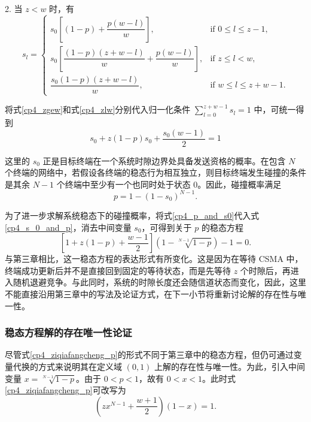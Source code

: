 2. 当 $z<w$ 时，有
    \begin{equation}\label{cp4_zlw}
        s_l =
\begin{cases}
s_0 \left[ (1 - p) + \dfrac{p(w-l)}{w} \right], & \text{if } 0 \le l \le z - 1, \\
s_0 \left[ \dfrac{(1-p)(z+w-l)}{w} + \dfrac{p(w-l)}{w} \right], & \text{if } z \le l < w, \\
\dfrac{s_0 (1-p)(z+w-l)}{w}, & \text{if } w \le l \le z + w - 1.
\end{cases}
    \end{equation}

将式\eqref{cp4_zgew}和式\eqref{cp4_zlw}分别代入归一化条件 $\sum_{l=0}^{z+w-1}s_l=1$ 中，可统一得到
\begin{equation}\label{cp4_s_0_and_p}
    s_0+z(1-p)s_0+\frac{s_0(w-1)}{2}=1
\end{equation}

这里的 $s_0$ 正是目标终端在一个系统时隙边界处具备发送资格的概率。在包含 $N$ 个终端的网络中，若假设各终端的稳态行为相互独立，则目标终端发生碰撞的条件是其余 $N-1$ 个终端中至少有一个也同时处于状态 0。因此，碰撞概率满足
\begin{equation}\label{cp4_p_and_s0}
    p=1-(1-s_0)^{N-1}.
\end{equation}

为了进一步求解系统稳态下的碰撞概率，将式\eqref{cp4_p_and_s0}代入式\eqref{cp4_s_0_and_p}，消去中间变量 $s_0$，可得到关于 $p$ 的稳态方程
\begin{equation}\label{cp4_ziqiafangcheng_p}
    \left[ 1 + z(1-p) + \frac{w-1}{2} \right] \left( 1 -\sqrt[N -1]{1-p} \right) - 1=0.
\end{equation}
与第三章相比，这一稳态方程的表达形式有所变化。这是因为在等待 CSMA 中，终端成功更新后并不是直接回到固定的等待状态，而是先等待 $z$ 个时隙后，再进入随机退避竞争。与此同时，系统的时隙长度还会随信道状态而变化，因此，这里不能直接沿用第三章中的写法及论证方式，在下一小节将重新讨论解的存在性与唯一性。

\subsubsection{稳态方程解的存在唯一性论证}

尽管式\eqref{cp4_ziqiafangcheng_p}的形式不同于第三章中的稳态方程，但仍可通过变量代换的方式来说明其在定义域 $(0,1)$ 上解的存在性与唯一性。为此，引入中间变量 $x=\sqrt[N-1]{1-p}$。由于 $0<p<1$，故有 $0<x<1$。此时式\eqref{cp4_ziqiafangcheng_p}可改写为
\begin{equation}\label{cp4_ziqiafangcheng_x}
    \left(zx^{N-1}+\frac{w+1}{2}\right)(1-x)=1.
\end{equation}

